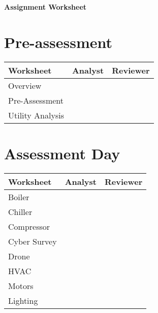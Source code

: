 \documentclass[./main.tex]{subfiles}
\begin{document}
\begin{center}
\Large\textbf{Assignment Worksheet}
\end{center}

\renewcommand{\arraystretch}{2} %

\section*{Pre-assessment}


\begin{tabular}{|p{5cm}|p{5cm}|p{5cm}|}
\hline
\textbf{Worksheet} & \textbf{Analyst} & \textbf{Reviewer} \\
\hline
Overview & & \\ \hline
Pre-Assessment & & \\ \hline
Utility Analysis & & \\ \hline
\end{tabular}

\section*{Assessment Day}

\begin{tabular}{|p{5cm}|p{5cm}|p{5cm}|}
\hline
\textbf{Worksheet} & \textbf{Analyst} & \textbf{Reviewer} \\
\hline
Boiler & & \\ \hline
Chiller & & \\ \hline
Compressor & & \\ \hline
Cyber Survey & & \\ \hline
Drone & & \\ \hline
HVAC & & \\ \hline
Motors & & \\ \hline
Lighting & & \\ \hline
\end{tabular}


\end{document}
